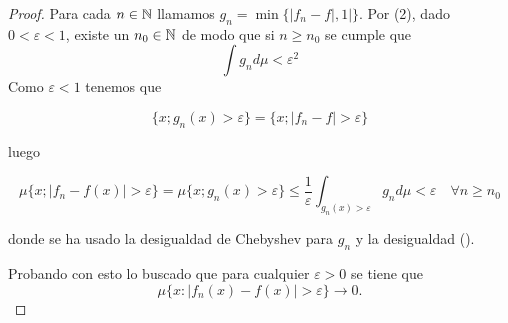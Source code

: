 \begin{proof}
    Para cada $n\in \mathbb{N}$ llamamos $g_n = \min\{|f_n - f|, 1|\}$.
    Por (2), dado $0 < \varepsilon < 1$, existe un $n_0 \in \mathbb{N}$
    de modo que si $n \geq n_0$ se cumple que 
    \begin{equation}\label{eq:definiciones_Básicas_Integral_GN_menor_Epsilon_Cuadrado}
        \int g_n d\mu < \varepsilon^2
    \end{equation}
    Como $\varepsilon < 1$ tenemos que 

    \begin{equation}
        \{ x; g_n(x) > \varepsilon \}
         = 
         \{ x; |f_n - f| > \varepsilon \}
    \end{equation}

    luego 

    \begin{equation}
        \mu\{ x; |f_n - f(x)| > \varepsilon \}
        = 
        \mu\{ x; g_n(x) > \varepsilon \}
        \leq
        \frac{1}{\varepsilon} 
        \int_{g_n(x) > \varepsilon} g_n d\mu 
        < \varepsilon 
        \quad
        \forall n \geq n_0
    \end{equation}

    donde se ha usado la desigualdad de Chebyshev para $g_n$ y la desigualdad 
    (). 

Probando con esto lo buscado que  para cualquier  $\varepsilon > 0$ se tiene que 
$$\mu \{  x : |f_n(x) - f(x)| > \varepsilon \} \longrightarrow 0.$$
\end{proof}


